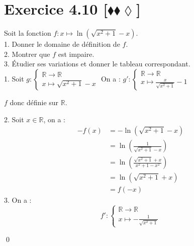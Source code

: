 \documentclass[10pt]{article}
\begin{document}
\section*{Exercice 4.10 [$\blacklozenge\blacklozenge\lozenge$]}
\begin{tcolorbox}[enhanced, width=7in, center, size=fbox, fontupper=\large, drop shadow southwest]
    Soit la fonction $f:x\mapsto\ln\left(\sqrt{x^2+1}-x\right)$.\\
    1. Donner le domaine de définition de $f$.\\
    2. Montrer que $f$ est impaire.\\
    3. Étudier ses variations et donner le tableau correspondant.\\[0.25cm]
    1. Soit $g:\begin{cases}\mathbb{R}\rightarrow\mathbb{R}\\x\mapsto\sqrt{x^2+1}-x\end{cases}$ On a : $g':\begin{cases}\mathbb{R}\rightarrow\mathbb{R}\\x\mapsto\frac{x}{\sqrt{x^2+1}}-1\end{cases}$
    \begin{center}
    \end{center}
    $f$ donc définie sur $\mathbb{R}$.
\end{tcolorbox}

\begin{tcolorbox}[enhanced, width=7in, center, size=fbox, fontupper=\large, drop shadow southwest]
    2. Soit $x\in\mathbb{R}$, on a :
    \begin{align*}
        -f(x)&=-\ln\left(\sqrt{x^2+1}-x\right)\\
        &=\ln\left(\frac{1}{\sqrt{x^2+1}-x}\right)\\
        &=\ln\left(\frac{\sqrt{x^2+1}+x}{x^2+1-x^2}\right)\\
        &=\ln\left(\sqrt{x^2+1}+x\right)\\
        &=f(-x)
    \end{align*}
    3. On a :
    \begin{equation*}
        f':\begin{cases}\mathbb{R}\rightarrow\mathbb{R}\\x\mapsto-\frac{1}{\sqrt{x^2+1}}\end{cases}
    \end{equation*}
    \begin{center}
    \end{center}
    \qed
\end{tcolorbox}
\end{document}
